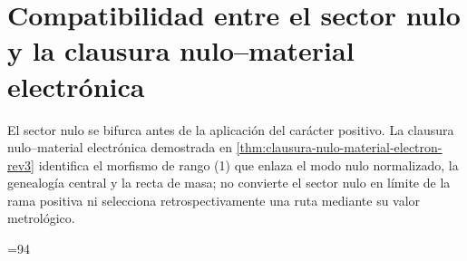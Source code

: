 

\section{Compatibilidad entre el sector nulo y la clausura nulo--material electrónica}
El sector nulo se bifurca antes de la aplicación del carácter positivo. La
clausura nulo--material electrónica demostrada en
\cref{thm:clausura-nulo-material-electron-rev3} identifica el morfismo de
rango (1) que enlaza el modo nulo normalizado, la genealogía central y la
recta de masa; no convierte el sector nulo en límite de la rama positiva ni
selecciona retrospectivamente una ruta mediante su valor metrológico.





\makeatletter
\ifHMTPartIVElectronOwnersInserted\else
  \PackageError{hmt-sucesor-102}{No se activaron los propietarios electronicos 06ka/06l}{La Parte IV no puede cerrarse sin sus cuerpos integros.}%
\fi
\ifnum\value{chapter}=94\relax
\else
  \PackageError{hmt-sucesor-102}{La Parte IV no termina en el capitulo 94}{Revise la correspondencia 56--90 a 58--92, 93 nuevo y 91 a 94.}%
\fi
\let\chapter\HMTPartIVPublicChapter
\makeatother










\HMTFlushCurrentChapter
